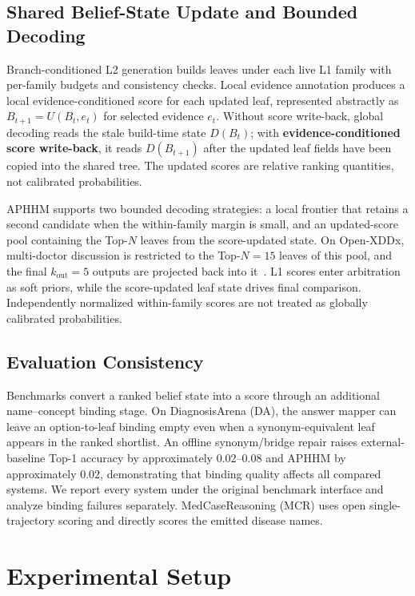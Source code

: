 \documentclass[letterpaper]{article} %
\begin{document}
\subsection{Shared Belief-State Update and Bounded Decoding}
\label{sec:m4}
\label{sec:m5}

Branch-conditioned L2 generation builds leaves under each live L1 family with per-family budgets and consistency checks.
Local evidence annotation produces a local evidence-conditioned score for each updated leaf, represented abstractly as $B_{t+1}=U(B_t,e_t)$ for selected evidence $e_t$.
Without score write-back, global decoding reads the stale build-time state $D(B_t)$; with \textbf{evidence-conditioned score write-back}, it reads $D(B_{t+1})$ after the updated leaf fields have been copied into the shared tree.
The updated scores are relative ranking quantities, not calibrated probabilities.

APHHM supports two bounded decoding strategies: a local frontier that retains a second candidate when the within-family margin is small, and an updated-score pool containing the Top-$N$ leaves from the score-updated state.
On Open-XDDx, multi-doctor discussion is restricted to the Top-$N{=}15$ leaves of this pool, and the final $k_{\mathrm{out}}{=}5$ outputs are projected back into it~\cite{chen2025mac,mac2026}.
L1 scores enter arbitration as soft priors, while the score-updated leaf state drives final comparison.
Independently normalized within-family scores are not treated as globally calibrated probabilities.

\subsection{Evaluation Consistency}
\label{sec:protocol}

Benchmarks convert a ranked belief state into a score through an additional name--concept binding stage.
On DiagnosisArena (DA), the answer mapper can leave an option-to-leaf binding empty even when a synonym-equivalent leaf appears in the ranked shortlist.
An offline synonym/bridge repair raises external-baseline Top-1 accuracy by approximately $0.02$--$0.08$ and APHHM by approximately $0.02$, demonstrating that binding quality affects all compared systems.
We report every system under the original benchmark interface and analyze binding failures separately.
MedCaseReasoning (MCR) uses open single-trajectory scoring and directly scores the emitted disease names.

\section{Experimental Setup}
\label{sec:experiments}
\end{document}
